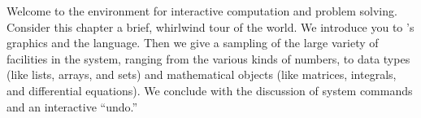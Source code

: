 
%
%
%
%
%


Welcome to the \Language{} environment for interactive computation
and problem solving.
Consider this chapter a brief, whirlwind tour of the \Language{}
world.
We introduce you to \Language{}'s graphics and the \Language{}
language.
Then we give a sampling of the large variety of facilities
in the \Language{} system, ranging from the various kinds of
numbers, to data types (like lists, arrays, and sets) and
mathematical objects (like matrices, integrals, and differential
equations).
We conclude with the discussion of system commands and an
interactive ``undo.''

